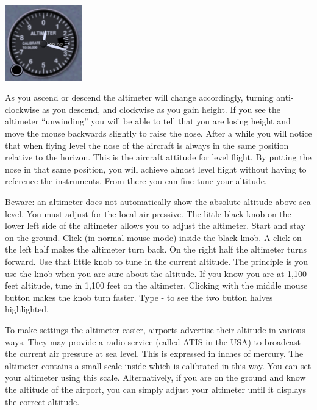 \begin{center}
\includegraphics[width=0.25\textwidth]{img/tut_17}
\end{center}

As you ascend or descend the altimeter will change accordingly, turning 
anti-clockwise as you descend, and clockwise as you gain height. If you see
the altimeter ``unwinding'' you will be able to tell that you are losing height
and move the mouse backwards slightly to raise the nose.
After a while you will notice that when flying level the nose of the aircraft
is always in the same position relative to the horizon. This is the aircraft
attitude for level flight. By putting the nose in that same position, you will
achieve almost level flight without having to reference the instruments. From
there you can fine-tune your altitude.

Beware: an altimeter does not automatically show the absolute altitude
above sea level. You must adjust for the local air
pressive. The little black knob on the lower left side of the
altimeter allows you to adjust the altimeter. Start 
\FlightGear{} and stay on the ground. Click (in normal mouse mode) inside the 
black knob. A click on the left half makes the altimeter turn back. On the 
right half the altimeter turns forward. Use that little knob to tune in the 
current altitude. The principle is you use the knob when you are sure about 
the altitude. If you know you are at 1,100 feet altitude, tune in 1,100 feet 
on the altimeter. Clicking with the middle mouse button makes the knob
turn faster. Type - to see the two button halves
highlighted.

To make settings the altimeter easier, airports advertise their altitude in 
various ways. They may provide a radio service (called ATIS in the USA) 
to broadcast the current air pressure at sea level. This is expressed in 
inches of mercury. The altimeter contains a small scale inside which is
calibrated in this way. You can set your altimeter using this scale. 
Alternatively, if you are on the ground and know the altitude of the airport,
you can simply adjust your altimeter until it displays the correct altitude.

